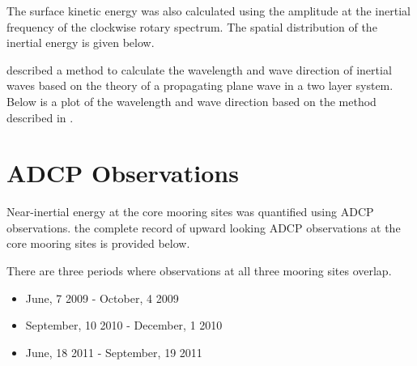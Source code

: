 
The surface kinetic energy was also calculated using the amplitude at the inertial frequency of the clockwise rotary spectrum. 
The spatial distribution of the inertial energy is given below. 


\citet{austin_2013} described a method to calculate the wavelength and wave direction of inertial waves based on the theory of
a propagating plane wave in a two layer system. Below is a plot of the wavelength and wave direction based on the method described in \citet{austin_2013}. 




\section{ADCP Observations}
Near-inertial energy at the core mooring sites was quantified using ADCP observations. the complete record of
upward looking ADCP observations at the core mooring sites is provided below. 


There are three periods where observations at all three mooring sites overlap. 

\begin{itemize}
	\item June, 7 2009 - October, 4 2009  
 	\item September, 10 2010  -   December, 1 2010
	\item June, 18 2011 -  September, 19 2011
\end{itemize}

